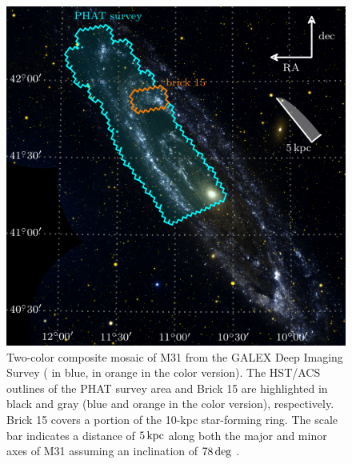 \begin{figure}
\centering
\includegraphics[scale=1]{uv_regions-figures/map_full.pdf}
\caption[Two-color composite mosaic of M31 from the GALEX Deep Imaging Survey.]{Two-color composite mosaic of M31 from the GALEX Deep Imaging Survey
    (\fuv{} in blue, \nuv{} in orange in the color version). The HST/ACS outlines of
    the PHAT survey area and Brick 15 are highlighted in black and gray (blue
    and orange in the color version), respectively. Brick 15 covers a portion of the 10-kpc
    star-forming ring. The scale bar indicates a distance of $5\,\mathrm{kpc}$
    along both the major and minor axes of M31 assuming an inclination of
    $78\,\mathrm{deg}$ \citep{Tully:1994}.
}
\label{fig:uvr:map_full}
\end{figure}


